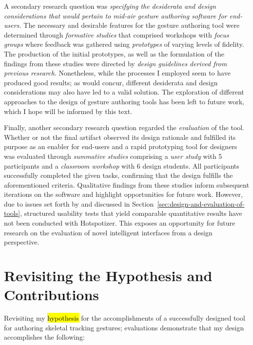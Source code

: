 A secondary research question was \emph{specifying the desiderata and design considerations that would pertain to mid-air gesture authoring software for end-users.} The necessary and desirable features for the gesture authoring tool were determined through \emph{formative studies} that comprised workshops with \emph{focus groups} where feedback was gathered using \emph{prototypes} of varying levels of fidelity. The production of the initial prototypes, as well as the formulation of the findings from these studies were directed by \emph{design guidelines derived from previous research}. Nonetheless, while the processes I employed seem to have produced good results; as \textcite{Zimmerman:2007} would concur, different desiderata and design considerations may also have led to a valid solution. The exploration of different approaches to the design of gesture authoring tools has been left to future work, which I hope will be informed by this text.

Finally, another secondary research question regarded the \emph{evaluation} of the tool. Whether or not the final artifact observed its design rationale and fulfilled its purpose as an enabler for end-users and a rapid prototyping tool for designers was evaluated through \emph{summative studies} comprising a \emph{user study} with 5 participants and a \emph{classroom workshop} with 6 design students. All participants successfully completed the given tasks, confirming that the design fulfills the aforementioned criteria. Qualitative findings from these studies inform subsequent iterations on the software and highlight opportunities for future work. However, due to issues set forth by \textcite{Olsen:2007} and discussed in Section~\ref{sec:design-and-evaluation-of-tools}, structured usability tests that yield comparable quantitative results have not been conducted with Hotspotizer. This exposes an opportunity for future research on the evaluation of novel intelligent interfaces from a design perspective.

\section{Revisiting the Hypothesis and Contributions}

Revisiting my \hl{hypothesis} for the accomplishments of a successfully designed tool for authoring skeletal tracking gestures; evaluations demonstrate that my design accomplishes the following:

